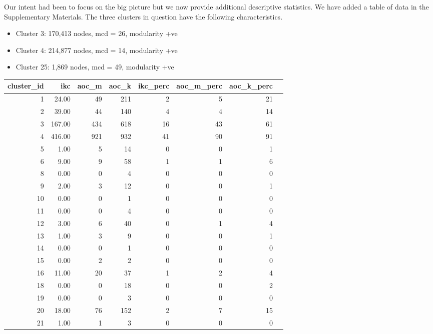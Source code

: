 \documentclass[11pt, oneside]{article}   	%
\begin{document}
Our intent had been to focus on the big picture but we now provide additional descriptive statistics. We have added a table of data in the Supplementary Materials. The three clusters in question have the following characteristics. 

\clearpage

\begin{itemize}
\item Cluster 3: 170,413 nodes, mcd = 26, modularity +ve
\item Cluster 4: 214,877 nodes, mcd = 14, modularity +ve
\item Cluster 25: 1,869 nodes, mcd = 49, modularity +ve
\end{itemize}



\begin{table}[ht]
\centering
\begin{tabular}{rrrrrrrr}
  \hline
cluster\_id & ikc & aoc\_m & aoc\_k & ikc\_perc & aoc\_m\_perc & aoc\_k\_perc \\ 
  \hline
1 & 24.00 &  49 & 211 &   2 &   5 &  21 \\ 
2 & 39.00 &  44 & 140 &   4 &   4 &  14 \\ 
3 & 167.00 & 434 & 618 &  16 &  43 &  61 \\ 
4 & 416.00 & 921 & 932 &  41 &  90 &  91 \\ 
5 & 1.00 &   5 &  14 &   0 &   0 &   1 \\ 
6 & 9.00 &   9 &  58 &   1 &   1 &   6 \\ 
8 & 0.00 &   0 &   4 &   0 &   0 &   0 \\ 
9 & 2.00 &   3 &  12 &   0 &   0 &   1 \\ 
10 & 0.00 &   0 &   1 &   0 &   0 &   0 \\ 
11 & 0.00 &   0 &   4 &   0 &   0 &   0 \\ 
12 & 3.00 &   6 &  40 &   0 &   1 &   4 \\ 
13 & 1.00 &   3 &   9 &   0 &   0 &   1 \\ 
14 & 0.00 &   0 &   1 &   0 &   0 &   0 \\ 
15 & 0.00 &   2 &   2 &   0 &   0 &   0 \\ 
16 & 11.00 &  20 &  37 &   1 &   2 &   4 \\ 
18 & 0.00 &   0 &  18 &   0 &   0 &   2 \\ 
19 & 0.00 &   0 &   3 &   0 &   0 &   0 \\ 
20 & 18.00 &  76 & 152 &   2 &   7 &  15 \\ 
21 & 1.00 &   1 &   3 &   0 &   0 &   0 \\ 

\end{tabular}
\end{table}
\end{document}
